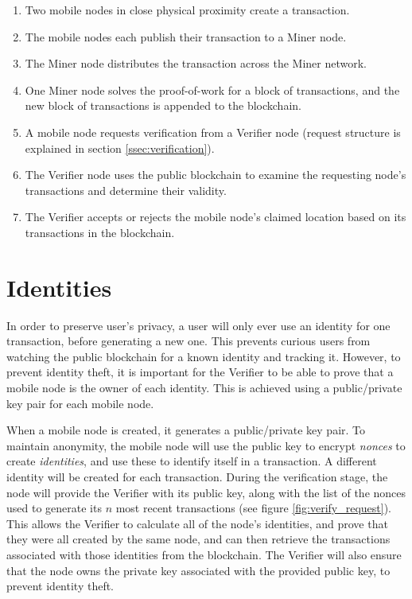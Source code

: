 \begin{enumerate}[label=\textbf{\arabic*}.]
\item Two mobile nodes in close physical proximity create a transaction.
\item The mobile nodes each publish their transaction to a Miner node.
\item The Miner node distributes the transaction across the Miner network.
\item One Miner node solves the proof-of-work for a block of transactions, and the new block of transactions is appended to the blockchain.
\item A mobile node requests verification from a Verifier node (request structure is explained in section \ref{ssec:verification}).
\item The Verifier node uses the public blockchain to examine the requesting node's transactions and determine their validity.
\item The Verifier accepts or rejects the  mobile node's claimed location based on its transactions in the blockchain. 
\end{enumerate}

\section{Identities}
In order to preserve user's privacy, a user will only ever use an identity for one transaction, before generating a new one. This prevents curious users from watching the public blockchain for a known identity and tracking it. However, to prevent identity theft, it is important for the Verifier to be able to prove that a mobile node is the owner of each identity. This is achieved using a public/private key pair for each mobile node.

When a mobile node is created, it generates a public/private key pair. To maintain anonymity, the mobile node will use the public key to encrypt \textit{nonces} to create \textit{identities}, and use these to identify itself in a transaction. A different identity will be created for each transaction. During the verification stage, the node will provide the Verifier with its public key, along with the list of the nonces used to generate its $n$ most recent transactions (see figure \ref{fig:verify_request}). This allows the Verifier to calculate all of the node's identities, and prove that they were all created by the same node, and can then retrieve the transactions associated with those identities from the blockchain. The Verifier will also ensure that the node owns the private key associated with the provided public key, to prevent identity theft.

